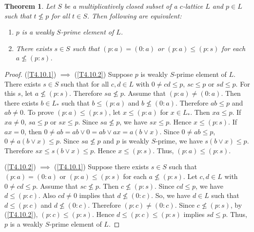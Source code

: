 \documentclass[10pt,twoside,a4paper]{amsart}
\numberwithin{equation}{section}
\theoremstyle{plain}
\newtheorem{thm}[lem]{Theorem}
\theoremstyle{definition}
\begin{document}
\begin{thm}\label{T4.10}
	Let $S$ be a multiplicatively closed subset of a $c$-lattice $L$ and $p\in L$ such that $t\nleq p$ for all $t\in S$. Then following are equivalent:
	\begin{enumerate}
		\item\label{T4.10.1} $p$ is a weakly $S$-prime element of $L$.
		\item\label{T4.10.2} There exists $s\in S$ such that $(p:a)=(0:a)$ or $(p:a)\leq (p:s)$ for each $a\nleq (p:s)$.
	\end{enumerate}
\end{thm}
\begin{proof}
	(\ref{T4.10.1}) $\implies$ (\ref{T4.10.2}) Suppose $p$ is weakly $S$-prime element of $L$. There exists $s\in S$ such that for all $c,d\in L$ with $0\neq cd\leq p$, $sc\leq p$ or $sd\leq p$. For this $s$, let $a\nleq (p:s)$. Therefore $sa\nleq p$. Assume that $(p:a)\neq (0:a)$. Then there exists $b\in L_*$ such that $b\leq (p:a)$ and $b\nleq (0:a)$. Therefore $ab\leq p$ and $ab\neq 0$.  To prove $(p:a)\leq (p:s)$, let $x\leq (p:a)$ for $x\in L_*$. Then $xa\leq p$. If $xa\neq 0$, $sa\leq p$ or $sx\leq p$. Since $sa\nleq p$, we have $sx\leq p$. Hence $x\leq (p:s)$. If $ax=0$, then $0\neq ab=ab\vee 0=ab\vee ax=a(b\vee x)$. Since $0\neq ab\leq p$, $0\neq a(b\vee x)\leq p$. Since $sa\nleq p$ and $p$ is weakly $S$-prime, we have $s(b\vee x)\leq p$. Therefore $sx\leq s(b\vee x)\leq p$. Hence $x\leq (p:s)$. Thus, $(p:a)\leq (p:s)$.
	
	(\ref{T4.10.2}) $\implies$ (\ref{T4.10.1}) Suppose there exists $s\in S$ such that $(p:a)=(0:a)$ or $(p:a)\leq (p:s)$ for each $a\nleq (p:s)$. Let $c,d\in L$ with $0\neq cd\leq p$. Assume that $sc\nleq p$. Then $c\nleq (p:s)$. Since $cd\leq p$, we have $d\leq (p:c)$. Also $cd\neq 0$ implies that $d\nleq (0:c)$. So, we have $d\in L$ such that $d\leq (p:c)$ and $d\nleq (0:c)$. Therefore $(p:c)\neq (0:c)$. Since $c\nleq (p:s)$, by (\ref{T4.10.2}), $(p:c)\leq (p:s)$. Hence $d\leq (p:c)\leq (p:s)$ implies $sd\leq p$. Thus, $p$ is a weakly $S$-prime element of $L$.
\end{proof}
\end{document}
